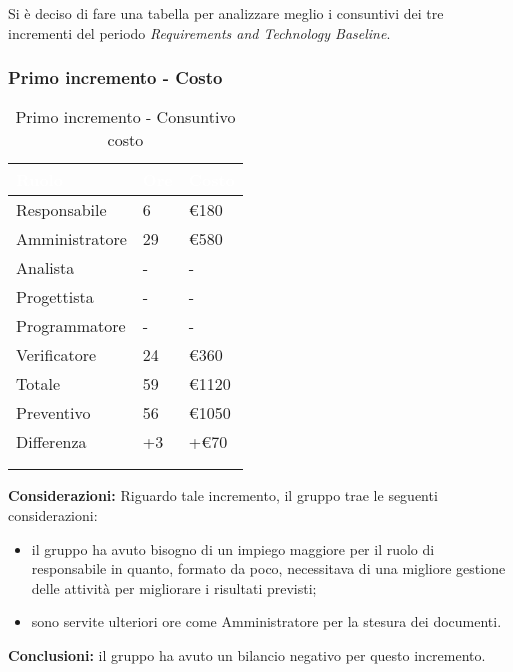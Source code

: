  { 
     Si è deciso di fare una tabella per analizzare meglio i consuntivi dei tre incrementi del periodo \textit{Requirements and Technology Baseline}.

\subsubsection{Primo incremento - Costo} 
{
      \setlength{\freewidth}{\dimexpr\textwidth-30\tabcolsep}
      \renewcommand{\arraystretch}{1.0}
      \centering
      \setlength{\aboverulesep}{0pt}
      \setlength{\belowrulesep}{0pt}
      \begin{longtable}{C{.4\freewidth} C{.2\freewidth} C{.2\freewidth}}
      \toprule
      \textcolor{white}{\textbf{Ruolo}}&
      \textcolor{white}{\textbf{Ore}}&
      \textcolor{white}{\textbf{Costo}}\\
      \toprule
      \endhead

      Responsabile & 6 & €180 \\
      Amministratore & 29 & €580 \\
      Analista & - & - \\
      Progettista & - & - \\
      Programmatore & - & - \\
      Verificatore & 24 & €360 \\
      Totale & 59 & €1120 \\
      Preventivo & 56 & €1050 \\
      Differenza & +3 & +€70 \\
      \bottomrule
      \\
      \caption{Primo incremento - Consuntivo costo}
      \end{longtable} 

      
      \textbf{Considerazioni:} 
        Riguardo tale incremento, il gruppo trae le seguenti considerazioni:
        \begin{itemize}
            \item il gruppo ha avuto bisogno di un impiego maggiore per il ruolo di responsabile in quanto, formato da poco, necessitava di una migliore gestione delle attività per migliorare i risultati previsti;
            \item sono servite ulteriori ore come Amministratore per la stesura dei documenti.
        \end{itemize}

        \textbf{Conclusioni:} il gruppo ha avuto un bilancio negativo per questo incremento. 
    }

}
